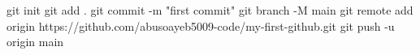 
git init
git add .
git commit -m "first commit"
git branch -M main
git remote add origin https://github.com/abusoayeb5009-code/my-first-github.git
git push -u origin main